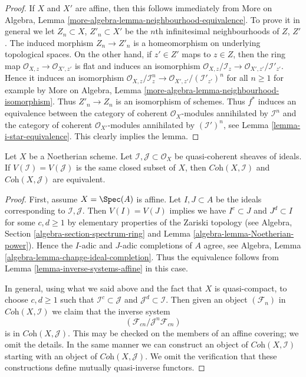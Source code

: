 \begin{proof}
If $X$ and $X'$ are affine, then this follows immediately from
More on Algebra, Lemma \ref{more-algebra-lemma-neighbourhood-equivalence}.
To prove it in general we let $Z_n \subset X$, $Z'_n \subset X'$
be the $n$th infinitesimal neighbourhoods of $Z$, $Z'$.
The induced morphism $Z_n \to Z'_n$ is a homeomorphism on
underlying topological spaces. On the other hand, if $z' \in Z'$
maps to $z \in Z$, then the ring map
$\mathcal{O}_{X, z} \to \mathcal{O}_{X', z'}$ is flat
and induces an isomorphism
$\mathcal{O}_{X, z}/\mathcal{I}_z \to \mathcal{O}_{X', z'}/\mathcal{I}'_{z'}$.
Hence it induces an isomorphism
$\mathcal{O}_{X, z}/\mathcal{I}_z^n \to
\mathcal{O}_{X', z'}/(\mathcal{I}'_{z'})^n$
for all $n \geq 1$ for example by
More on Algebra, Lemma \ref{more-algebra-lemma-neighbourhood-isomorphism}.
Thus $Z'_n \to Z_n$ is an isomorphism of schemes.
Thus $f^*$ induces an equivalence between the
category of coherent $\mathcal{O}_X$-modules annihilated by $\mathcal{I}^n$
and the
category of coherent $\mathcal{O}_{X'}$-modules annihilated by
$(\mathcal{I}')^n$, see
Lemma \ref{lemma-i-star-equivalence}.
This clearly implies the lemma.
\end{proof}

\begin{lemma}
\label{lemma-inverse-systems-ideals-equivalence}
Let $X$ be a Noetherian scheme. Let
$\mathcal{I}, \mathcal{J} \subset \mathcal{O}_X$
be quasi-coherent sheaves of ideals.
If $V(\mathcal{I}) = V(\mathcal{J})$ is the same closed subset
of $X$, then $\textit{Coh}(X, \mathcal{I})$ and $\textit{Coh}(X, \mathcal{J})$
are equivalent.
\end{lemma}

\begin{proof}
First, assume $X = \Spec(A)$ is affine. Let $I, J \subset A$ be the ideals
corresponding to $\mathcal{I}, \mathcal{J}$. Then $V(I) = V(J)$
implies we have $I^c \subset J$ and $J^d \subset I$ for some $c, d \geq 1$
by elementary properties of the Zariski topology
(see Algebra, Section \ref{algebra-section-spectrum-ring} and
Lemma \ref{algebra-lemma-Noetherian-power}).
Hence the $I$-adic and $J$-adic completions of $A$ agree, see
Algebra, Lemma \ref{algebra-lemma-change-ideal-completion}.
Thus the equivalence follows from Lemma \ref{lemma-inverse-systems-affine}
in this case.

\medskip\noindent
In general, using what we said above and the fact that
$X$ is quasi-compact, to choose $c, d \geq 1$ such that
$\mathcal{I}^c \subset \mathcal{J}$ and $\mathcal{J}^d \subset \mathcal{I}$.
Then given an object $(\mathcal{F}_n)$ in
$\textit{Coh}(X, \mathcal{I})$ we claim that the
inverse system
$$
(\mathcal{F}_{cn}/\mathcal{J}^n\mathcal{F}_{cn})
$$
is in $\textit{Coh}(X, \mathcal{J})$. This may be checked on
the members of an affine covering; we omit the details.
In the same manner we can construct an object of
$\textit{Coh}(X, \mathcal{I})$ starting with an object of
$\textit{Coh}(X, \mathcal{J})$. We omit the verification
that these constructions define mutually quasi-inverse functors.
\end{proof}





